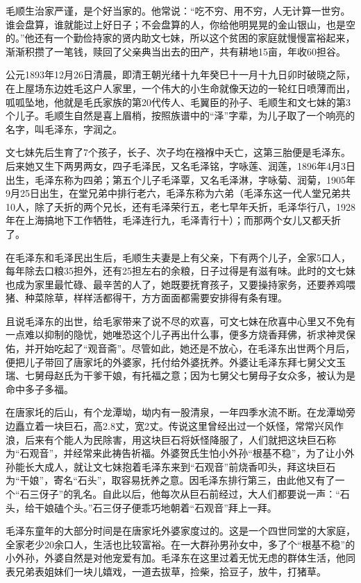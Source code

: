 \documentclass[../../dazhuan.tex]{subfiles}
\begin{document}
毛顺生治家严谨，是个好当家的。他常说：“吃不穷、用不穷，人无计算一世穷。谁会盘算，谁就能过上好日子；不会盘算的人，你给他明晃晃的金山银山，也是空的。”他还有一个勤俭持家的贤内助文七妹，所以这个贫困的家庭就慢慢富裕起来，渐渐积攒了一笔钱，赎回了父亲典当出去的田产，共有耕地15亩，年收60担谷。

公元1893年12月26日清晨，即清王朝光绪十九年癸巳十一月十九日卯时破晓之际，在上屋场东边姓毛这户人家里，一个伟大的小生命就像天边的一轮红日喷薄而出，呱呱坠地，他就是毛氏家族的第20代传人、毛翼臣的孙子、毛顺生和文七妹的第3个儿子。毛顺生自然是喜上眉梢，按照族谱中的“泽”字辈，为儿子取了一个响亮的名字，叫毛泽东，字润之。

文七妹先后生育了7个孩子，长子、次子均在襁褓中夭亡，这第三胎便是毛泽东。后来她又生下两男两女，四子毛泽民，又名毛泽铭，字咏莲、润莲，1896年4月3日出生，毛泽东称为四弟；第五个儿子毛泽覃，又名毛泽淋，字咏菊、润菊，1905年9月25日出生，在堂兄弟中排行老六，毛泽东称为六弟（毛泽东这一代人堂兄弟共10人，除了夭折的两个兄长，还有毛泽荣行五，老七早年夭折，毛泽华行八，1928年在上海搞地下工作牺牲，毛泽连行九，毛泽青行十）；而那两个女儿又都夭折了。

在毛泽东和毛泽民出生后，毛顺生夫妻是上有父亲，下有两个儿子，全家5口人，每年除去口粮35担外，还有25担左右的余粮，日子过得是有滋有味。此时的文七妹也成为家里最忙碌、最辛苦的人了，她既要抚育孩子，又要操持家务，还要养鸡喂猪、种菜除草，样样活都得干，方方面面都需要安排得有条有理。

且说毛泽东的出世，给毛家带来了说不尽的欢喜，可文七妹在欣喜中心里又不免有一点难以抑制的隐忧，她唯恐这个儿子再出什么事，便多方烧香拜佛，祈求神灵保佑，并开始吃起了“观音斋”。尽管如此，她还是不放心，在毛泽东出世两个月后，便把儿子带回了唐家圫的外婆家，托付给外婆抚养。外婆让毛泽东拜七舅父文玉瑞、七舅母赵氏为干爹干娘，有托福之意；因为七舅父七舅母子女众多，被认为是命中多子多福。

在唐家圫的后山，有个龙潭坳，坳内有一股清泉，一年四季水流不断。在龙潭坳旁边矗立着一块巨石，高2.8丈，宽2丈。传说这里曾经出过一个妖怪，常常兴风作浪，后来有个能人为民除害，用这块巨石将妖怪降服了，人们就把这块巨石称为“石观音”，并经常来此祷告祈福。外婆贺氏生怕小外孙“根基不稳”，为了让小外孙能长大成人，就让文七妹抱着毛泽东来到“石观音”前烧香叩头，拜这块巨石为“干娘”，寄名“石头”，取容易抚养之意。因毛泽东排行第三，由此他又有了一个“石三伢子”的乳名。自此以后，他每次从巨石前经过，大人们都要说一声：“石头，给干娘磕个头。”石三伢子便乖巧地朝着“石观音”拜上一拜。

毛泽东童年的大部分时间是在唐家圫外婆家度过的。这是一个四世同堂的大家庭，全家老少20余口人，生活也比较富裕。在一大群孙男孙女中，多了个“根基不稳”的小外孙，外婆自然是对他宠爱有加。毛泽东在这里过着无忧无虑的群体生活，他同表兄弟表姐妹们一块儿嬉戏，一道去拔草，捡柴，拾豆子，放牛，打猪草。
\end{document}
